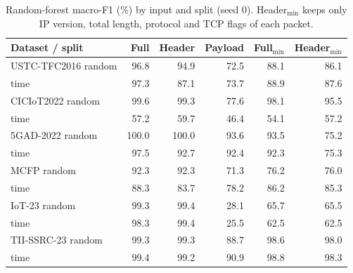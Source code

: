 \begin{table}[t]
\centering
\caption{Random-forest macro-F1 (\%) by input and split (seed 0). Header$_{\min}$ keeps only IP version, total length, protocol and TCP flags of each packet.}
\label{tab:header-payload}
\setlength{\tabcolsep}{3pt}
\begin{tabular}{lrrrrr}
\toprule
Dataset / split & Full & Header & Payload & Full$_{\min}$ & Header$_{\min}$ \\
\midrule
USTC-TFC2016 random & 96.8 & 94.9 & 72.5 & 88.1 & 86.1 \\
 time & 97.3 & 87.1 & 73.7 & 88.9 & 87.6 \\
\addlinespace[2pt]
CICIoT2022 random & 99.6 & 99.3 & 77.6 & 98.1 & 95.5 \\
 time & 57.2 & 59.7 & 46.4 & 54.1 & 57.2 \\
\addlinespace[2pt]
5GAD-2022 random & 100.0 & 100.0 & 93.6 & 93.5 & 75.2 \\
 time & 97.5 & 92.7 & 92.4 & 92.3 & 75.3 \\
\addlinespace[2pt]
MCFP random & 92.3 & 92.3 & 71.3 & 76.2 & 76.0 \\
 time & 88.3 & 83.7 & 78.2 & 86.2 & 85.3 \\
\addlinespace[2pt]
IoT-23 random & 99.3 & 99.4 & 28.1 & 65.7 & 65.5 \\
 time & 98.3 & 99.4 & 25.5 & 62.5 & 62.5 \\
\addlinespace[2pt]
TII-SSRC-23 random & 99.3 & 99.3 & 88.7 & 98.6 & 98.0 \\
 time & 99.4 & 99.2 & 90.9 & 98.8 & 98.3 \\
\bottomrule
\end{tabular}
\end{table}
